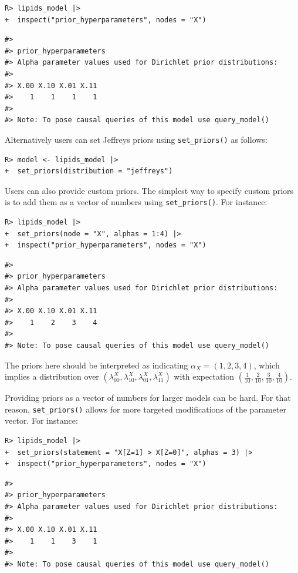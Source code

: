 \documentclass[
  11pt,
  article]{jss}
\begin{document}
\begin{verbatim}
R> lipids_model |> 
+  inspect("prior_hyperparameters", nodes = "X") 
\end{verbatim}

\begin{verbatim}
#> 
#> prior_hyperparameters
#> Alpha parameter values used for Dirichlet prior distributions:
#> 
#> X.00 X.10 X.01 X.11 
#>    1    1    1    1 
#> 
#> Note: To pose causal queries of this model use query_model()
\end{verbatim}

Alternatively users can set Jeffreys priors using \texttt{set\_priors()}
as follows:

\begin{verbatim}
R> model <- lipids_model |> 
+  set_priors(distribution = "jeffreys")
\end{verbatim}

Users can also provide custom priors. The simplest way to specify custom
priors is to add them as a vector of numbers using
\texttt{set\_priors()}. For instance:

\begin{verbatim}
R> lipids_model |> 
+  set_priors(node = "X", alphas = 1:4) |> 
+  inspect("prior_hyperparameters", nodes = "X")
\end{verbatim}

\begin{verbatim}
#> 
#> prior_hyperparameters
#> Alpha parameter values used for Dirichlet prior distributions:
#> 
#> X.00 X.10 X.01 X.11 
#>    1    2    3    4 
#> 
#> Note: To pose causal queries of this model use query_model()
\end{verbatim}

The priors here should be interpreted as indicating
\(\alpha_X = (1,2, 3, 4)\), which implies a distribution over
\((\lambda^X_{00},\lambda^X_{10}, \lambda^X_{01}, \lambda^X_{11})\) with
expectation
\(\left(\frac1{10}, \frac2{10}, \frac3{10}, \frac4{10} \right)\).

Providing priors as a vector of numbers for larger models can be hard.
For that reason, \texttt{set\_priors()} allows for more targeted
modifications of the parameter vector. For instance:

\begin{verbatim}
R> lipids_model |>
+  set_priors(statement = "X[Z=1] > X[Z=0]", alphas = 3) |>
+  inspect("prior_hyperparameters", nodes = "X")
\end{verbatim}

\begin{verbatim}
#> 
#> prior_hyperparameters
#> Alpha parameter values used for Dirichlet prior distributions:
#> 
#> X.00 X.10 X.01 X.11 
#>    1    1    3    1 
#> 
#> Note: To pose causal queries of this model use query_model()
\end{verbatim}
\end{document}
